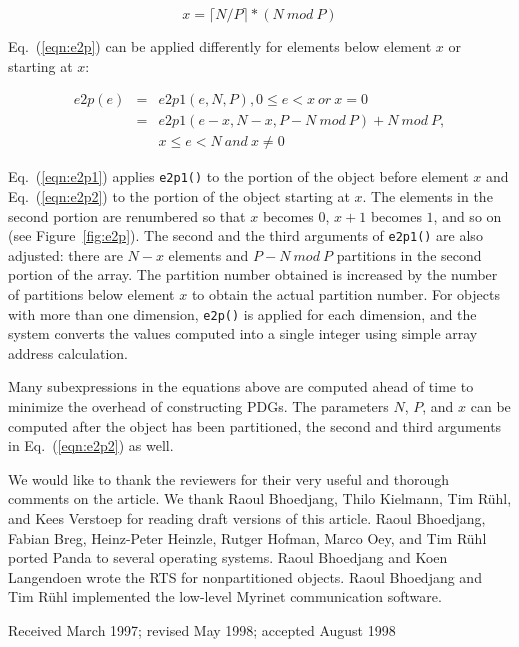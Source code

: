 \documentclass{acmtrans2e}
\begin{document}
\begin{equation}
x = \lceil N / P \rceil * (N~ mod ~P)  \label{eqn:x}
\end{equation}


Eq.~(\ref{eqn:e2p}) can be applied
differently for elements below element $x$ or starting at $x$:

\begin{eqnarray}
e2p(e) & = & e2p1(e,N,P), 0 \leq e < x \label{eqn:e2p1}~or~x = 0 \\
 & = & e2p1(e - x, N - x, P - N~mod~P) + N~mod~P, \nonumber \\
 &   & x \leq e < N~and~x \neq 0 \label{eqn:e2p2}
\end{eqnarray}

Eq.~(\ref{eqn:e2p1}) applies \verb+e2p1()+ to the portion of the
object before element $x$ and Eq.~(\ref{eqn:e2p2}) to the portion
of the object starting at $x$. The elements in the second portion are
renumbered so that $x$ becomes $0$, $x+1$ becomes $1$, and so on (see
Figure~\ref{fig:e2p}). The second and the third arguments of
\verb+e2p1()+ are also adjusted: there are $N-x$ elements and
$P - N~mod~P$ partitions in the second portion of the
array. The partition number obtained is
increased by the number of partitions below element $x$ to obtain the
actual partition number. For objects with more than one dimension,
\verb+e2p()+ is applied for each dimension, and the system converts the
values computed into a single integer using simple array address
calculation.

Many subexpressions in the equations above are computed ahead of time
to minimize the overhead of constructing PDGs. The parameters $N$,
$P$, and $x$ can be computed after the object has been partitioned,
the second and third arguments in Eq.~(\ref{eqn:e2p2}) as well.

\begin{acks}
We would like to thank the reviewers for their very useful
and thorough comments on the article.
We thank Raoul Bhoedjang, Thilo Kielmann, Tim R\"{u}hl, and Kees
Verstoep for reading draft versions of this article. Raoul Bhoedjang,
Fabian Breg, Heinz-Peter Heinzle, Rutger Hofman, Marco Oey, and Tim
R\"{u}hl ported Panda to several operating systems. Raoul Bhoedjang
and Koen Langendoen wrote the RTS for nonpartitioned objects.
Raoul Bhoedjang and Tim R\"{u}hl implemented the low-level Myrinet
communication software.
\end{acks}



\begin{received}
Received March 1997; revised May 1998; accepted August 1998
\end{received}
\end{document}
